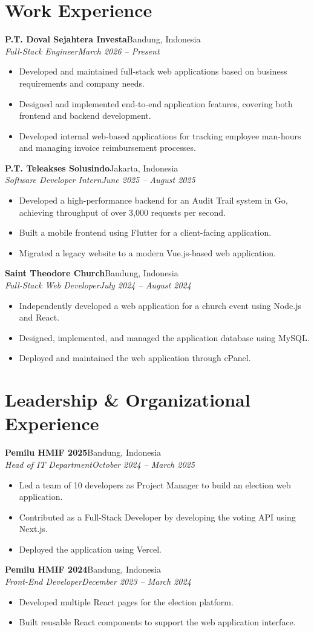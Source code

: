 \documentclass[11pt,a4paper]{article}
\newcommand{\entry}[4]{%
  \Needspace{4\baselineskip}%
  \textbf{#1}\hfill #2\\
  \textit{#3}\hfill\textit{#4}\par}
\begin{document}
\section*{Work Experience}
\entry{P.T. Doval Sejahtera Investa}{Bandung, Indonesia}{Full-Stack Engineer}{March 2026 -- Present}
\begin{itemize}
\item Developed and maintained full-stack web applications based on business requirements and company needs.
\item Designed and implemented end-to-end application features, covering both frontend and backend development.
\item Developed internal web-based applications for tracking employee man-hours and managing invoice reimbursement processes.
\end{itemize}
\entry{P.T. Teleakses Solusindo}{Jakarta, Indonesia}{Software Developer Intern}{June 2025 -- August 2025}
\begin{itemize}
\item Developed a high-performance backend for an Audit Trail system in Go, achieving throughput of over 3,000 requests per second.
\item Built a mobile frontend using Flutter for a client-facing application.
\item Migrated a legacy website to a modern Vue.js-based web application.
\end{itemize}
\entry{Saint Theodore Church}{Bandung, Indonesia}{Full-Stack Web Developer}{July 2024 -- August 2024}
\begin{itemize}
\item Independently developed a web application for a church event using Node.js and React.
\item Designed, implemented, and managed the application database using MySQL.
\item Deployed and maintained the web application through cPanel.
\end{itemize}

\section*{Leadership \& Organizational Experience}
\entry{Pemilu HMIF 2025}{Bandung, Indonesia}{Head of IT Department}{October 2024 -- March 2025}
\begin{itemize}
\item Led a team of 10 developers as Project Manager to build an election web application.
\item Contributed as a Full-Stack Developer by developing the voting API using Next.js.
\item Deployed the application using Vercel.
\end{itemize}
\entry{Pemilu HMIF 2024}{Bandung, Indonesia}{Front-End Developer}{December 2023 -- March 2024}
\begin{itemize}
\item Developed multiple React pages for the election platform.
\item Built reusable React components to support the web application interface.
\end{itemize}
\end{document}
